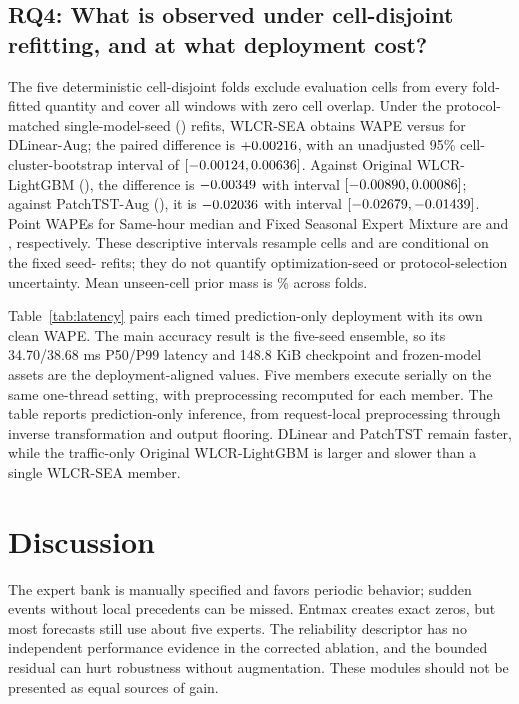 \documentclass[10pt,conference,letterpaper]{IEEEtran}
\newcommand{\method}{WLCR-SEA}
\newcommand{\originalmethod}{Original WLCR-LightGBM}
\newcommand{\fixedmixture}{Fixed Seasonal Expert Mixture}
\begin{document}
\subsection{RQ4: What is observed under cell-disjoint refitting, and at what deployment cost?}
The five deterministic cell-disjoint folds exclude evaluation cells from every fold-fitted quantity and cover all \RQFourEvaluationWindowCount{} windows with zero cell overlap. Under the protocol-matched single-model-seed (\RQFourModelSeed{}) refits, \method{} obtains \RQFourWLCRWAPE{} WAPE versus \RQFourDLinearWAPE{} for DLinear-Aug; the paired difference is $+0.00216{}$, with an unadjusted 95\% cell-cluster-bootstrap interval of $[-0.00124{},0.00636{}]$. Against \originalmethod{} (\RQFourOriginalWAPE{}), the difference is $-0.00349{}$ with interval $[-0.00890{},0.00086{}]$; against PatchTST-Aug (\RQFourPatchWAPE{}), it is $-0.02036{}$ with interval $[-0.02679{},-0.01439{}]$. Point WAPEs for Same-hour median and \fixedmixture{} are \RQFourSameHourWAPE{} and \RQFourFixedMixtureWAPE{}, respectively. These descriptive intervals resample \RQFourClusterCount{} cells and are conditional on the fixed seed-\RQFourModelSeed{} refits; they do not quantify optimization-seed or protocol-selection uncertainty. Mean unseen-cell prior mass is \RQFourPriorMassPercent{}\% across folds.

Table~\ref{tab:latency} pairs each timed prediction-only deployment with its own clean WAPE. The main accuracy result is the five-seed ensemble, so its 34.70/38.68 ms P50/P99 latency and 148.8 KiB checkpoint and frozen-model assets are the deployment-aligned values. Five members execute serially on the same one-thread setting, with preprocessing recomputed for each member. The table reports prediction-only inference, from request-local preprocessing through inverse transformation and output flooring. DLinear and PatchTST remain faster, while the traffic-only \originalmethod{} is larger and slower than a single \method{} member.



\section{Discussion}\label{sec:discussion}
The expert bank is manually specified and favors periodic behavior; sudden events without local precedents can be missed. Entmax creates exact zeros, but most forecasts still use about five experts. The reliability descriptor has no independent performance evidence in the corrected ablation, and the bounded residual can hurt robustness without augmentation. These modules should not be presented as equal sources of gain.
\end{document}
